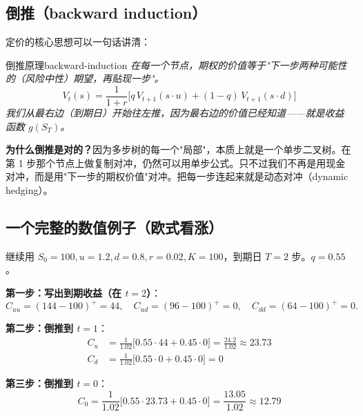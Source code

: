 \documentclass[11pt,a4paper]{ctexart}
\newcommand{\1}{\mathbf{1}}
\begin{document}
\subsection{倒推（backward induction）}

定价的核心思想可以一句话讲清：

\begin{idea}{倒推原理}{backward-induction}
\itshape 在每一个节点，期权的价值等于"下一步两种可能性的（风险中性）期望，再贴现一步"。
\[
V_t(s) = \frac{1}{1+r}\bigl[q\, V_{t+1}(s \cdot u) + (1-q)\, V_{t+1}(s \cdot d)\bigr]
\]
我们从最右边（到期日）开始往左推，因为最右边的价值已经知道——就是收益函数 $g(S_T)$。
\end{idea}

\textbf{为什么倒推是对的？}因为多步树的每一个"局部"，本质上就是一个单步二叉树。在第 1 步那个节点上做复制对冲，仍然可以用单步公式。只不过我们不再是用现金对冲，而是用"下一步的期权价值"对冲。把每一步连起来就是动态对冲（dynamic hedging）。

\subsection{一个完整的数值例子（欧式看涨）}

继续用 $S_0=100, u=1.2, d=0.8, r=0.02, K=100$，到期日 $T = 2$ 步。$q = 0.55$。

\textbf{第一步：写出到期收益（在 $t=2$）}：
\[
C_{uu} = (144-100)^+ = 44, \quad C_{ud} = (96-100)^+ = 0, \quad C_{dd} = (64-100)^+ = 0.
\]

\textbf{第二步：倒推到 $t=1$}：
\begin{align*}
C_u &= \frac{1}{1.02}\bigl[0.55\cdot 44 + 0.45 \cdot 0\bigr] = \frac{24.2}{1.02} \approx 23.73 \\
C_d &= \frac{1}{1.02}\bigl[0.55\cdot 0 + 0.45 \cdot 0\bigr] = 0
\end{align*}

\textbf{第三步：倒推到 $t=0$}：
\[
C_0 = \frac{1}{1.02}\bigl[0.55 \cdot 23.73 + 0.45 \cdot 0\bigr] = \frac{13.05}{1.02} \approx 12.79
\]
\end{document}
